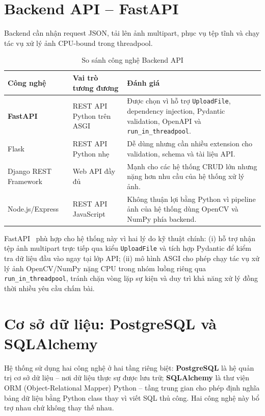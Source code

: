 \section{Backend API -- FastAPI}

Backend cần nhận request JSON, tải lên ảnh multipart, phục vụ tệp tĩnh và chạy tác vụ xử lý ảnh CPU-bound trong threadpool.

\begin{table}[H]
\centering
\caption{So sánh công nghệ Backend API}
\label{tab:so-sanh-backend-api}
\renewcommand{\arraystretch}{1.25}
\small
\begin{tabular}{|L{2.7cm}|L{4.1cm}|L{7.2cm}|}
\hline
\textbf{Công nghệ} & \textbf{Vai trò tương đương} & \textbf{Đánh giá} \\
\hline

\textbf{FastAPI} &
REST API Python trên ASGI &
Được chọn vì hỗ trợ \texttt{UploadFile}, dependency injection, Pydantic validation, OpenAPI và \texttt{run\_in\_threadpool}. \\
\hline

Flask &
REST API Python nhẹ &
Dễ dùng nhưng cần nhiều extension cho validation, schema và tài liệu API. \\
\hline

Django REST Framework &
Web API đầy đủ &
Mạnh cho các hệ thống CRUD lớn nhưng nặng hơn nhu cầu của hệ thống xử lý ảnh. \\
\hline

Node.js/Express &
REST API JavaScript &
Không thuận lợi bằng Python vì pipeline ảnh của hệ thống dùng OpenCV và NumPy phía backend. \\
\hline

\end{tabular}
\normalsize
\end{table}

FastAPI~\cite{fastapi} phù hợp cho hệ thống này vì hai lý do kỹ thuật chính: (i) hỗ trợ nhận tệp ảnh multipart trực tiếp qua kiểu \texttt{UploadFile} và tích hợp Pydantic để kiểm tra dữ liệu đầu vào ngay tại lớp API; (ii) mô hình ASGI cho phép chạy tác vụ xử lý ảnh OpenCV/NumPy nặng CPU trong nhóm luồng riêng qua \texttt{run\_in\_threadpool}, tránh chặn vòng lặp sự kiện và duy trì khả năng xử lý đồng thời nhiều yêu cầu chấm bài.
\section{Cơ sở dữ liệu: PostgreSQL và SQLAlchemy}

Hệ thống sử dụng hai công nghệ ở hai tầng riêng biệt: \textbf{PostgreSQL} là hệ quản trị cơ sở dữ liệu -- nơi dữ liệu thực sự được lưu trữ; \textbf{SQLAlchemy} là thư viện ORM (Object-Relational Mapper) Python -- tầng trung gian cho phép định nghĩa bảng dữ liệu bằng Python class thay vì viết SQL thủ công. Hai công nghệ này bổ trợ nhau chứ không thay thế nhau.

